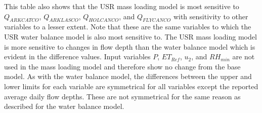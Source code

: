 This table also shows that the USR mass loading model is most sensitive to $ Q_{ARKCATCO} $, $ Q_{ARKLASCO} $, $ Q_{HOLCANCO} $, and $ Q_{FLYCANCO} $ with sensitivity to other variables to a lesser extent.  Note that these are the same variables to which the USR water balance model is also most sensitive to.  The USR mass loading model is more sensitive to changes in flow depth than the water balance model which is evident in the difference values.  Input variables $ P $, $ ET_{Ref} $, $ u_2 $, and $ RH_{min} $ are not used in the mass loading model and therefore show no change from the base model.  As with the water balance model, the differences between the upper and lower limits for each variable are symmetrical for all variables except the reported average daily flow depths.  These are not symmetrical for the same reason as described for the water balance model.
\\
